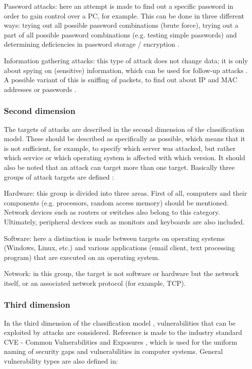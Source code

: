 \documentclass[conference]{IEEEtran}
\begin{document}
\smallskip Password attacks: here an attempt is made to find out a specific password in order to gain control over a PC, for example. This can be done in three different ways: trying out all possible password combinations (brute force), trying out a part of all possible password combinations (e.g. testing simple passwords) and determining deficiencies in password storage / encryption \cite{b2,b5}.

\smallskip Information gathering attacks: this type of attack does not change data; it is only about spying on (sensitive) information, which can be used for follow-up attacks \cite{b5}. A possible variant of this is sniffing of packets, to find out about IP and MAC addresses or passwords \cite{b2}.

\medskip \subsubsection{Second dimension}The targets of attacks are described in the second dimension of the classification model. These should be described as specifically as possible, which means that it is not sufficient, for example, to specify which server was attacked, but rather which service or which operating system is affected with which version. It should also be noted that an attack can target more than one target. Basically three groups of attack targets are defined \cite{b5}:

\smallskip Hardware: this group is divided into three areas. First of all, computers and their components (e.g. processors, random access memory) should be mentioned. Network devices such as routers or switches also belong to this category. Ultimately, peripheral devices such as monitors and keyboards are also included.

\smallskip Software: here a distinction is made between targets on operating systems (Windows, Linux, etc.) and various applications (email client, text processing program) that are executed on an operating system.

\smallskip Network: in this group, the target is not software or hardware but the network itself, or an associated network protocol (for example, TCP).

\medskip \subsubsection{Third dimension}In the third dimension of the classification model \cite{b5}, vulnerabilities that can be exploited by attacks are considered. Reference is made to the industry standard CVE - Common Vulnerabilities and Exposures \cite{b7}, which is used for the uniform naming of security gaps and vulnerabilities in computer systems. General vulnerability types are also defined in\cite{b8}:
\end{document}
